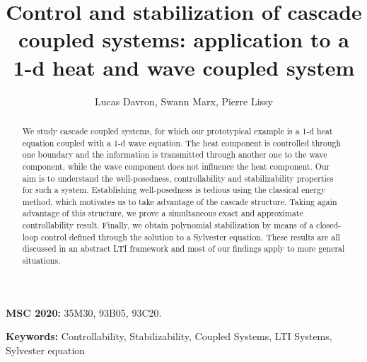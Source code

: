 \documentclass[10pt]{article}
\title{Control and stabilization of cascade coupled systems: application to a 1-d heat and wave coupled system}
\author{Lucas Davron, Swann Marx, Pierre Lissy}
\begin{document}
\maketitle	

\begin{abstract}
We study cascade coupled systems, for which our prototypical example is a 1-d heat equation coupled with a 1-d wave equation. The heat component is controlled through one boundary and the information is transmitted through another one to the wave component, while the wave component does not influence the heat component. Our aim is to understand the well-posedness, controllability and stabilizability properties for such a system. Establishing well-posedness is tedious using the classical energy method, which motivates us to take advantage of the cascade structure. Taking again advantage of this structure, we prove a simultaneous exact and approximate controllability result. Finally, we obtain polynomial stabilization by means of a closed-loop control defined through the solution to a Sylvester equation. These results are all discussed in an abstract LTI framework and most of our findings apply to more general situations.
\end{abstract}

\vspace*{0.3cm}



\textbf{MSC 2020:} 35M30, 93B05, 93C20.

\vspace*{0.3cm}

\textbf{Keywords: } Controllability, Stabilizability, Coupled Systems, LTI Systems, Sylvester equation 
\end{document}

